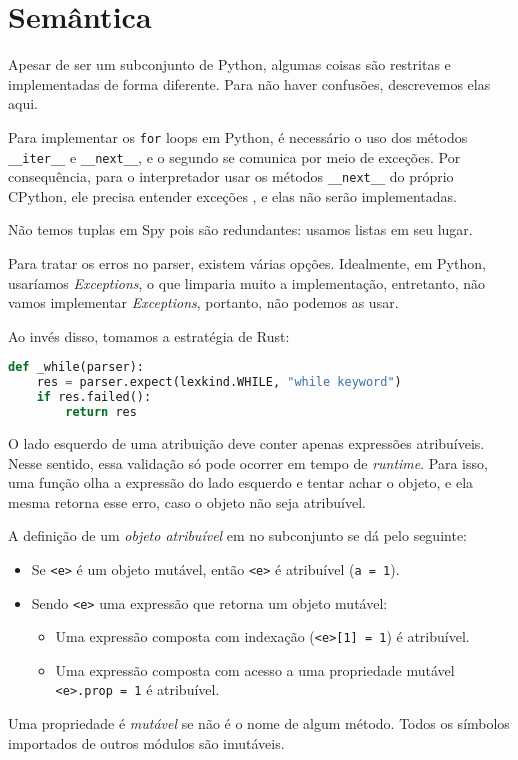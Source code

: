 \section{Semântica}

Apesar de ser um subconjunto de Python, algumas coisas
são restritas e implementadas de forma diferente. Para
não haver confusões, descrevemos elas aqui.

Para implementar os \verb|for| loops em Python, é necessário o
uso dos métodos \verb|__iter__| e \verb|__next__|, e o segundo
se comunica por meio de exceções. Por consequência, para o
interpretador usar os métodos \verb|__next__| do próprio
CPython, ele precisa entender exceções \cite{iterator_next}, e
elas não serão implementadas.

Não temos tuplas em Spy pois são redundantes: usamos listas
em seu lugar.

Para tratar os erros no parser, existem várias opções.
Idealmente, em Python, usaríamos \textit{Exceptions}, o que
limparia muito a implementação, entretanto, não
vamos implementar \textit{Exceptions}, portanto,
não podemos as usar.

Ao invés disso, tomamos a estratégia de Rust:

\begin{lstlisting}[language=Python]
def _while(parser):
    res = parser.expect(lexkind.WHILE, "while keyword")
    if res.failed():
        return res
\end{lstlisting}

O lado esquerdo de uma atribuição deve conter apenas expressões atribuíveis.
Nesse sentido, essa validação só pode ocorrer em tempo de \textit{runtime}.
Para isso, uma função olha a expressão do lado esquerdo e
tentar achar o objeto, e ela mesma retorna esse erro, caso
o objeto não seja atribuível.

A definição de um \emph{objeto atribuível} em
no subconjunto se dá pelo seguinte:
\begin{itemize}
    \item Se \verb|<e>| é um objeto mutável,
    então \verb|<e>| é atribuível (\verb|a = 1|).
    \item Sendo \verb|<e>| uma expressão que retorna um
    objeto mutável:
    \begin{itemize}
        \item Uma expressão composta com indexação (\verb|<e>[1] = 1|) é atribuível.
        \item Uma expressão composta com acesso a uma propriedade mutável \verb|<e>.prop = 1| é atribuível.
    \end{itemize}
\end{itemize}

Uma propriedade é \emph{mutável} se não é o nome de algum
método. Todos os símbolos importados de outros módulos
são imutáveis.
